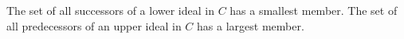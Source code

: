 The set of all successors of a lower ideal in $C$ has a smallest member. The set of all predecessors of an upper ideal in $C$ has a largest member.
